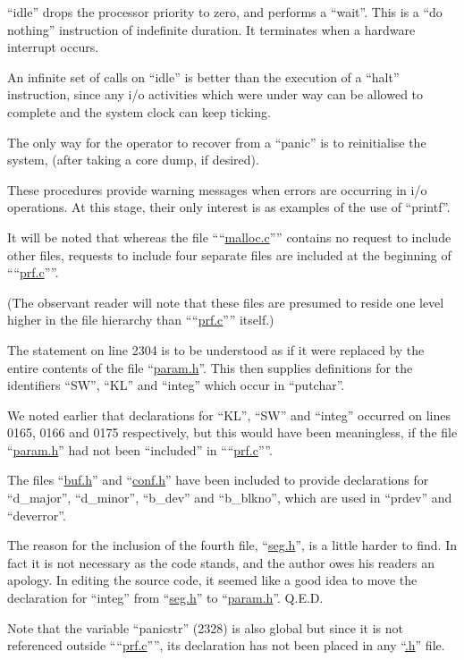 ``idle'' drops the processor priority to zero, and performs a
``wait''. This is a ``do nothing''
instruction of indefinite duration. It terminates when a
hardware interrupt occurs.

An infinite set of calls on ``idle'' is
better than the execution of a ``halt''
instruction, since any i/o activities
which were under way can be allowed to
complete and the system clock can keep
ticking.

The only way for the operator to
recover from a ``panic'' is to reinitialise the system, (after taking a core
dump, if desired).
\ed



These procedures provide warning messages when errors are occurring in i/o
operations. At this stage, their only
interest is as examples of the use of
``printf''.



It will be noted that whereas the file
````\href{./v6/ken/malloc.c}{malloc.c}'''' contains no request to
include other files, requests to
include four separate files are
included at the beginning of ````\href{./v6/ken/prf.c}{prf.c}''''.

(The observant reader will note that
these files are presumed to reside one
level higher in the file hierarchy than
````\href{./v6/ken/prf.c}{prf.c}'''' itself.)


The statement on line 2304 is to be
understood as if it were replaced by
the entire contents of the file
``\href{./v6/param.h}{param.h}''. This then supplies definitions for the identifiers ``SW'', ``KL''
and ``integ'' which occur in ``putchar''.

We noted earlier that declarations for
``KL'', ``SW'' and ``integ'' occurred on
lines 0165, 0166 and 0175 respectively,
but this would have been meaningless,
if the file ``\href{./v6/param.h}{param.h}'' had not been
``included'' in ````\href{./v6/ken/prf.c}{prf.c}''''.

The files ``\href{./v6/buf.h}{buf.h}'' and ``\href{./v6/conf.h}{conf.h}'' have
been included to provide declarations
for ``d\_major'', ``d\_minor'', ``b\_dev'' and
``b\_blkno'', which are used in ``prdev''
and ``deverror''.

The reason for the inclusion of the
fourth file, ``\href{./v6/seg.h}{seg.h}'', is a little
harder to find. In fact it is not
necessary as the code stands, and the
author owes his readers an apology. In
editing the source code, it seemed like
a good idea to move the declaration for
``integ'' from ``\href{./v6/seg.h}{seg.h}'' to ``\href{./v6/param.h}{param.h}''.
Q.E.D.

Note that the variable ``panicstr''
(2328) is also global but since it is
not referenced outside ````\href{./v6/ken/prf.c}{prf.c}'''', its
declaration has not been placed in any
``\href{./v6/.h}{.h}'' file.
